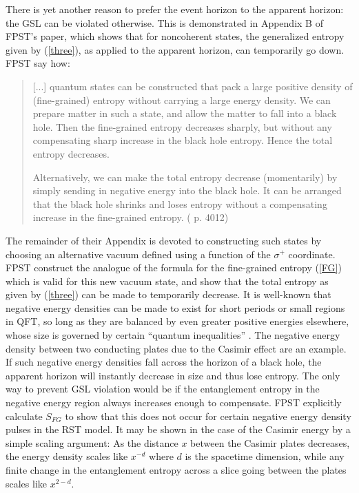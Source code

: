 \documentclass[12pt]{article}
\begin{document}
There is yet another reason to prefer the event horizon to the apparent horizon: the GSL can be violated otherwise.  This is demonstrated in Appendix B of FPST's paper, which shows that for noncoherent states, the generalized entropy given by (\ref{three}), as applied to the apparent horizon, can temporarily go down.  FPST say how:
\begin{quote}\small
[...] quantum states can be constructed that pack a large positive density of (fine-grained) entropy without carrying a large energy density.  We can prepare matter in such a state, and allow the matter to fall into a black hole.  Then the fine-grained entropy decreases sharply, but without any compensating sharp increase in the black hole entropy.  Hence the total entropy decreases.

Alternatively, we can make the total entropy decrease (momentarily) by simply sending in negative energy into the black hole.  It can be arranged that the black hole shrinks and loses entropy without a compensating increase in the fine-grained entropy.  (\cite{fiola94} p. 4012)
\end{quote}
The remainder of their Appendix is devoted to constructing such states by choosing an alternative vacuum defined using a function of the $\sigma^{+}$ coordinate.  FPST construct the analogue of the formula for the fine-grained entropy (\ref{FG}) which is valid for this new vacuum state, and show that the total entropy as given by (\ref{three}) can be made to temporarily decrease.  It is well-known that negative energy densities can be made to exist for short periods or small regions in QFT, so long as they are balanced by even greater positive energies elsewhere, whose size is governed by certain ``quantum inequalities'' \cite{FR95}.  The negative energy density between two conducting plates due to the Casimir effect are an example.  If such negative energy densities fall across the horizon of a black hole, the apparent horizon will instantly decrease in size and thus lose entropy.  The only way to prevent GSL violation would be if the entanglement entropy in the negative energy region always increases enough to compensate.  FPST explicitly calculate $S_{FG}$ to show that this does not occur for certain negative energy density pulses in the RST model.  It may be shown in the case of the Casimir energy by a simple scaling argument: As the distance $x$ between the Casimir plates decreases, the energy density scales like $x^{-d}$ where $d$ is the spacetime dimension, while any finite change in the entanglement entropy across a slice going between the plates scales like $x^{2-d}$.
\end{document}
